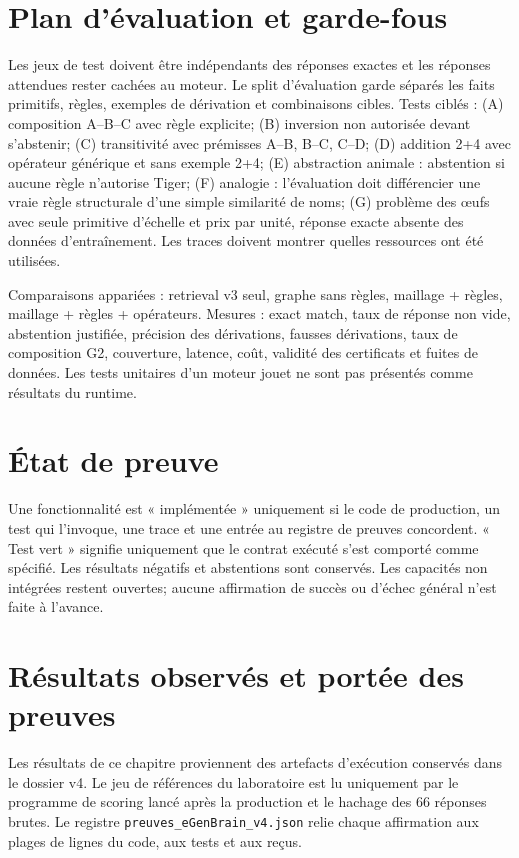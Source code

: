\documentclass[11pt,a4paper]{book}
\begin{document}
\chapter{Plan d'évaluation et garde-fous}
Les jeux de test doivent être indépendants des réponses exactes et les réponses attendues rester cachées au moteur. Le split d'évaluation garde séparés les faits primitifs, règles, exemples de dérivation et combinaisons cibles. Tests ciblés : (A) composition A--B--C avec règle explicite; (B) inversion non autorisée devant s'abstenir; (C) transitivité avec prémisses A--B, B--C, C--D; (D) addition 2+4 avec opérateur générique et sans exemple 2+4; (E) abstraction animale : abstention si aucune règle n'autorise Tiger; (F) analogie : l'évaluation doit différencier une vraie règle structurale d'une simple similarité de noms; (G) problème des œufs avec seule primitive d'échelle et prix par unité, réponse exacte absente des données d'entraînement. Les traces doivent montrer quelles ressources ont été utilisées.

Comparaisons appariées : retrieval v3 seul, graphe sans règles, maillage + règles, maillage + règles + opérateurs. Mesures : exact match, taux de réponse non vide, abstention justifiée, précision des dérivations, fausses dérivations, taux de composition G2, couverture, latence, coût, validité des certificats et fuites de données. Les tests unitaires d'un moteur jouet ne sont pas présentés comme résultats du runtime.

\chapter{État de preuve}
Une fonctionnalité est « implémentée » uniquement si le code de production, un test qui l'invoque, une trace et une entrée au registre de preuves concordent. « Test vert » signifie uniquement que le contrat exécuté s'est comporté comme spécifié. Les résultats négatifs et abstentions sont conservés. Les capacités non intégrées restent ouvertes; aucune affirmation de succès ou d'échec général n'est faite à l'avance.



\chapter{Résultats observés et portée des preuves}
Les résultats de ce chapitre proviennent des artefacts d'exécution conservés dans le dossier v4. Le jeu de références du laboratoire est lu uniquement par le programme de scoring lancé après la production et le hachage des 66 réponses brutes. Le registre \texttt{preuves\_eGenBrain\_v4.json} relie chaque affirmation aux plages de lignes du code, aux tests et aux reçus.
\end{document}
